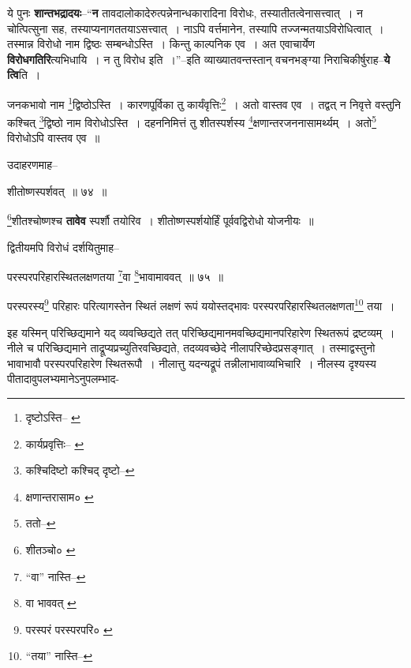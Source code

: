 \documentclass[article,12pt,a4paper]{memoir}
\begin{document}
	  \pstart ये पुनः \textbf{शान्तभद्रादयः}--“\textbf{न} तावदालोकादेरुत्पन्नेनान्धकारादिना विरोधः, तस्यातीतत्वेनासत्त्वात् । न चोत्पित्सुना सह, तस्याप्यनागततयाऽसत्त्वात् । नाऽपि वर्त्तमानेन, तस्यापि तज्जन्मतयाऽविरोधित्वात् । तस्मान्न विरोधो नाम द्विष्ठः सम्बन्धोऽस्ति । किन्तु काल्पनिक एव । अत एवाचार्येण \textbf{विरोधगतिरि}त्यभिधायि । न तु विरोध इति ।”--इति व्याख्यातवन्तस्तान् वचनभङ्ग्या निराचिकीर्षुराह--\textbf{ये त्वि}ति ।
	\pend
      \leavevmode{}
	  \bigskip
	  \begingroup
	

	  \pstart जनकभावो नाम \footnote{दृष्टोऽस्ति--\cite{dp-msA} \cite{dp-msB} \cite{dp-edP} \cite{dp-edH} \cite{dp-edE} \cite{dp-edN}}द्विष्ठोऽस्ति । कारणपूर्विका तु कार्यंवृत्तिः\footnote{कार्यप्रवृत्तिः--\cite{dp-msA} \cite{dp-msB} \cite{dp-msC} \cite{dp-msD} \cite{dp-edP} \cite{dp-edH} \cite{dp-edE} \cite{dp-edN}} । अतो वास्तव एव । तद्वत् न निवृत्ते वस्तुनि कश्चित् \footnote{कश्चिदिष्टो \cite{dp-msA} \cite{dp-msB} \cite{dp-edP} \cite{dp-edH} \cite{dp-edN} कश्चिद् दृष्टो--\cite{dp-edE}}द्विष्ठो नाम विरोधोऽस्ति । दहननिमित्तं तु शीतस्पर्शस्य \footnote{क्षणान्तरासाम० \cite{dp-msA} \cite{dp-msB} \cite{dp-edP} \cite{dp-edH} \cite{dp-edE} \cite{dp-edN}}क्षणान्तरजननासामर्थ्यम् । अतो\footnote{ततो--\cite{dp-msC}} विरोधोऽपि वास्तव एव ॥
	\pend
       

	  \pstart उदाहरणमाह--
	\pend
       
	  \bigskip
	  \begingroup
	

	  \pstart शीतोष्णस्पर्शवत् ॥ ७४ ॥
	\pend
      
	  \endgroup
	 

	  \pstart \footnote{शीतञ्चो० \cite{dp-msD}}शीतश्चोष्णश्च \textbf{तावेव} स्पर्शौ तयोरिव । शीतोष्णस्पर्शयोर्हिं पूर्ववद्विरोधो योजनीयः ॥
	\pend
       

	  \pstart द्वितीयमपि विरोधं दर्शयितुमाह--
	\pend
       
	  \bigskip
	  \begingroup
	

	  \pstart परस्परपरिहारस्थितलक्षणतया \footnote{“वा” नास्ति--\cite{dp-msC}}वा \footnote{वा भाववत् \cite{dp-msB} \cite{dp-edP} \cite{dp-edH}}भावामाववत् ॥ ७५ ॥
	\pend
      
	  \endgroup
	 

	  \pstart परस्परस्य\footnote{परस्परं \cite{dp-msA} \cite{dp-msB} \cite{dp-edP} परस्परपरि० \cite{dp-edH} \cite{dp-edE}} परिहारः परित्यागस्तेन स्थितं लक्षणं रूपं ययोस्तद्भावः परस्परपरिहारस्थितलक्षणता\footnote{“तया” नास्ति--\cite{dp-msC}} तया ।
	\pend
       

	  \pstart इह यस्मिन् परिच्छिद्यमाने यद् व्यवच्छिद्यते तत् परिच्छिद्यमानमवच्छिद्यमानपरिहारेण स्थितरूपं द्रष्टव्यम् । नीले च परिच्छिद्यमाने ताद्रूप्यप्रच्युतिरवच्छिद्यते, तदव्यवच्छेदे नीलापरिच्छेदप्रसङ्गात् । तस्माद्वस्तुनो भावाभावौ परस्परपरिहारेण स्थितरूपौ । नीलात्तु यदन्यद्रूपं तन्नीलाभावाव्यभिचारि । नीलस्य दृश्यस्य पीतादावुपलभ्यमानेऽनुपलम्भाद-
	\pend
      
\end{document}
